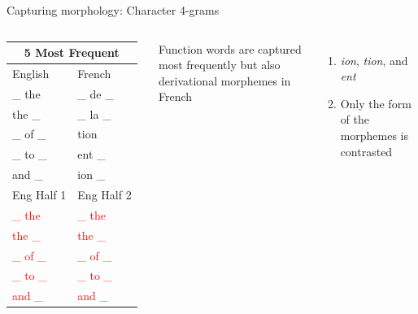 \documentclass{beamer}\usepackage[]{graphicx}\usepackage[]{color}
\newcommand{\lexi}[1]{\textit{#1}}
\newcommand{\hlight}[1]{\textcolor{red}{#1}}
\begin{document}
    \begin{frame}{Capturing morphology: Character 4-grams}
      \begin{columns}
          \begin{tabular}{l l}
            \multicolumn{2}{c}{5 Most Frequent} \\
            \hline
            English                                       & French \\
            \hline
            \_ the              & \_ de \_ \\
            the \_              & \_ la \_ \\
            \_ of \_            & tion \\
            \_ to \_            & ent \_ \\
            and \_              & ion \_ \\
            \hline
            Eng Half 1                                    & Eng Half 2 \\
            \hline
            \hlight{\_ the}   & \hlight{\_ the} \\
            \hlight{the \_}   & \hlight{the \_} \\
            \hlight{\_ of \_} & \hlight{\_ of \_} \\
            \hlight{\_ to \_} & \hlight{\_ to \_} \\
            \hlight{and \_}   & \hlight{and \_} \\
          \end{tabular}
          Function words are captured most frequently but also derivational morphemes in French
          \begin{enumerate}
            \item \lexi{ion}, \lexi{tion}, and \lexi{ent}
            \item Only the form of the morphemes is contrasted
          \end{enumerate}
      \end{columns}
    \end{frame}
\end{document}
